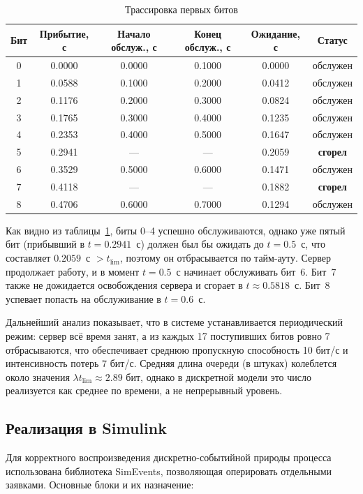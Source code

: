 \documentclass[a4paper,12pt]{article}
\begin{document}
\begin{table}[h!]
    \centering
    \caption{Трассировка первых битов}
    \label{tab:bit_trace}
    \begin{tabular}{|c|c|c|c|c|c|}
        \hline
        \textbf{Бит} & \textbf{Прибытие, с} & \textbf{Начало обслуж., с} & \textbf{Конец обслуж., с} & \textbf{Ожидание, с} & \textbf{Статус} \\
        \hline
        0 & 0.0000 & 0.0000 & 0.1000 & 0.0000 & обслужен \\
        1 & 0.0588 & 0.1000 & 0.2000 & 0.0412 & обслужен \\
        2 & 0.1176 & 0.2000 & 0.3000 & 0.0824 & обслужен \\
        3 & 0.1765 & 0.3000 & 0.4000 & 0.1235 & обслужен \\
        4 & 0.2353 & 0.4000 & 0.5000 & 0.1647 & обслужен \\
        5 & 0.2941 & ---     & ---      & 0.2059 & \textbf{сгорел} \\
        6 & 0.3529 & 0.5000 & 0.6000 & 0.1471 & обслужен \\
        7 & 0.4118 & ---     & ---      & 0.1882 & \textbf{сгорел} \\
        8 & 0.4706 & 0.6000 & 0.7000 & 0.1294 & обслужен \\
        \hline
    \end{tabular}
\end{table}

Как видно из таблицы~\ref{tab:bit_trace}, биты 0--4 успешно обслуживаются, однако
уже пятый бит (прибывший в $t = 0.2941$~с) должен был бы ожидать до $t = 0.5$~с,
что составляет $0.2059$~с $> t_{\text{lim}}$, поэтому он отбрасывается по тайм-ауту.
Сервер продолжает работу, и в момент $t = 0.5$~с начинает обслуживать бит~6.
Бит~7 также не дожидается освобождения сервера и сгорает в $t \approx 0.5818$~с.
Бит~8 успевает попасть на обслуживание в $t = 0.6$~с.

Дальнейший анализ показывает, что в системе устанавливается периодический режим:
сервер всё время занят, а из каждых 17 поступивших битов ровно 7 отбрасываются,
что обеспечивает среднюю пропускную способность 10 бит/с и интенсивность потерь
7 бит/с. Средняя длина очереди (в штуках) колеблется около значения
$\lambda t_{\text{lim}} \approx 2.89$ бит, однако в дискретной модели это число
реализуется как среднее по времени, а не непрерывный уровень.

\subsection*{Реализация в Simulink}
Для корректного воспроизведения дискретно-событийной природы процесса использована
библиотека SimEvents, позволяющая оперировать отдельными заявками. Основные блоки
и их назначение:
\end{document}
